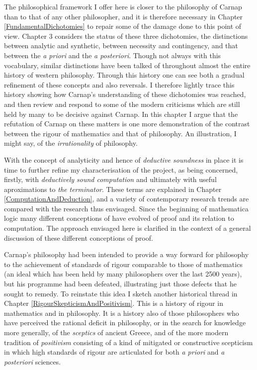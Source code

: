The philosophical framework I offer here is closer to the philosophy
of Carnap than to that of any other philosopher, and it is therefore
necessary in Chapter \ref{FundamentalDichotomies} to repair some of
the damage done to this point of view.
Chapter 3 considers the status of these three dichotomies, the
distinctions between analytic and synthetic, between necessity and
contingency, and that between the \emph{a priori} and the \emph{a posteriori}.
Though not always with this vocabulary, similar distinctions have been
talked of throughout almost the entire history of western philosophy.
Through this history one can see both a gradual refinement of these
concepts and also reversals.
I therefore lightly trace this history showing how Carnap's
understanding of these dichotomies was reached, and then review and
respond to some of the modern criticisms which are still held by many
to be decisive against Carnap.
In this chapter I argue that the refutation of Carnap on these matters
is one more demonstration of the contrast between the rigour of
mathematics and that of philosophy.
An illustration, I might say, of the \emph{irrationality} of philosophy.

With the concept of analyticity and hence of \emph{deductive
  soundness} in place it is time to further refine my characterisation
of the project, as being concerned, firstly, with \emph{deductively
  sound computation} and ultimately with useful aproximations to \emph{the terminator}.
These terms are explained in Chapter
\ref{ComputationAndDeduction}, and a variety of
contemporary research trends are compared with the research thus envisaged.
Since the beginning of mathematica logic many different conceptions of
have evolved of proof and its relation to computation.
The approach envisaged here is clarified in the context of a general
discussion of these different conceptions of proof.

Carnap's philosophy had been intended to provide a way forward for
philosophy to the achievement of standards of rigour comparable to
those of mathematics (an ideal which has been held by many
philosophers over the last 2500 years), but his programme had been
defeated, illustrating  just those defects that he sought to remedy.
To reinstate this idea I sketch another historical thread in Chapter \ref{RigourSkepticismAndPositivism}.
This is a history of rigour in mathematics and in philosophy.
It is a history also of those philosophers who have perceived the
rational deficit in philosophy, or in the search for knowledge more
generally, of the \emph{sceptics} of ancient Greece, and of the more
modern tradition of \emph{positivism} consisting of a kind of
mitigated or constructive scepticism in which high standards of rigour
are articulated for both \emph{a priori} and \emph{a posteriori} sciences.


